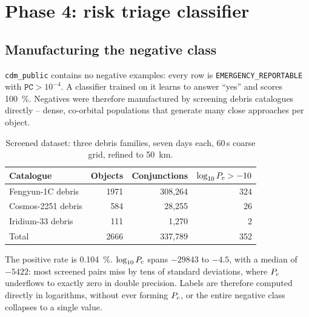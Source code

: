 
\section{Phase 4: risk triage classifier}\label{sec:phase4}

\subsection{Manufacturing the negative class}

\texttt{cdm\_public} contains no negative examples: every row is
\texttt{EMERGENCY\_REPORTABLE} with $\texttt{PC} > 10^{-4}$. A classifier
trained on it learns to answer ``yes'' and scores \SI{100}{\percent}.
Negatives were therefore manufactured by screening debris catalogues
directly -- dense, co-orbital populations that generate many close
approaches per object.

\begin{table}[htbp]
\centering
\caption{Screened dataset: three debris families, seven days each, 60\,s
         coarse grid, refined to \SI{50}{\kilo\meter}.}
\label{tab:dataset}
\begin{tabular}{lrrr}
\toprule
Catalogue & Objects & Conjunctions & $\log_{10}P_c > -10$ \\
\midrule
Fengyun-1C debris   & 1971 & 308{,}264 & 324 \\
Cosmos-2251 debris  &  584 &  28{,}255 &  26 \\
Iridium-33 debris   &  111 &   1{,}270 &   2 \\
\midrule
Total               & 2666 & 337{,}789 & 352 \\
\bottomrule
\end{tabular}
\end{table}

The positive rate is \SI{0.104}{\percent}. $\log_{10}P_c$ spans
$-29843$ to $-4.5$, with a median of $-5422$: most screened pairs miss by
tens of standard deviations, where $P_c$ underflows to exactly zero in
double precision. Labels are therefore computed directly in logarithms,
without ever forming $P_c$, or the entire negative class collapses to a
single value.


